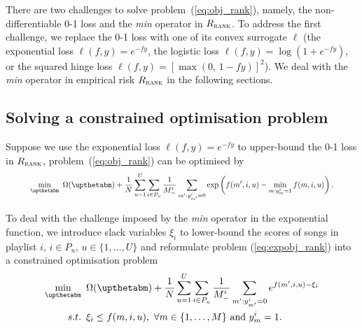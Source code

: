 There are two challenges to %
solve problem~(\ref{eq:obj_rank}),
namely, the non-differentiable 0-1 loss and the \emph{min} operator in $R_\textsc{rank}$.
To address the first challenge, we replace the 0-1 loss with one of its convex surrogate $\ell$
(\eg the exponential loss $\ell(f, y) = e^{-fy}$, the logistic loss $\ell(f, y) = \log(1 + e^{-fy})$,
or the squared hinge loss $\ell(f, y) = [\max(0, \, 1 - fy)]^2$).
We deal with the \emph{min} operator in empirical risk $R_\textsc{rank}$ in the following sections.




\subsection{Solving a constrained optimisation problem}

Suppose we use the exponential loss $\ell(f, y) = e^{-fy}$ to upper-bound the 0-1 loss in $R_\textsc{rank}$,
problem~(\ref{eq:obj_rank}) can be optimised by
\begin{equation}
\label{eq:expobj_rank}
\resizebox{.9\linewidth}{!}{$\displaystyle
\min_{\upthetabm} \ \Omega(\upthetabm) + \frac{1}{N} \sum_{u=1}^U \sum_{i \in P_u} \frac{1}{M_-^i} 
                  \sum_{m': y_{m'}^i = 0} \exp \left(f(m', i, u) - \min_{m: y_m^i = 1} f(m, i, u) \right).
$}
\end{equation}

To deal with the challenge imposed by the \emph{min} operator in the exponential function, 
we introduce slack variables $\xi_i$ to lower-bound the scores of songs in playlist $i, \, i \in P_u, \, u \in \{1,\dots,U\}$ 
and 
reformulate problem (\ref{eq:expobj_rank}) into a constrained optimisation problem %
\begin{equation}
\label{eq:expobj_cons}
\begin{aligned}
\min_{\upthetabm} \ \, & \Omega(\upthetabm) + \frac{1}{N} \sum_{u=1}^U \sum_{i \in P_u} \frac{1}{M_-^i} \sum_{m': y_{m'}^i = 0} e^{f(m', i, u) - \xi_i} \\
s.t. \ \, & \xi_i \le f(m, i, u), \ \forall m \in \{1,\dots,M\} \ \text{and} \ y_m^i = 1.
\end{aligned}
\end{equation}

